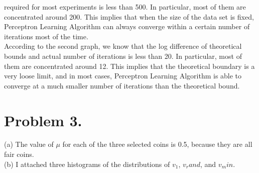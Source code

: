 \documentclass{article}
\begin{document}
    required for most experiments is less than 500. In particular, most of them are concentrated around 200. This 
    implies that when the size of the data set is fixed, Perceptron Learning Algorithm can always converge 
    within a certain number of iterations most of the time.\\ 
    According to the second graph, we know that the log difference of theoretical bounds and actual number of 
    iterations is less than 20. In particular, most of them are concentrated around 12. This implies that the 
    theoretical boundary is a very loose limit, and in most cases, Perceptron Learning Algorithm is able to converge 
    at a much smaller number of iterations than the theoretical bound.

    \section*{Problem 3.}
    (a) The value of $\mu$ for each of the three selected coins is 0.5, because they are all fair coins.\\
    (b) I attached three histograms of the distributions of $v_1$, $v_rand$, and $v_min$.
\end{document}
